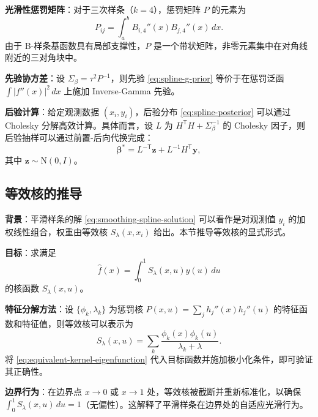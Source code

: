 \textbf{光滑性惩罚矩阵}：对于三次样条（$k=4$），惩罚矩阵 $P$ 的元素为
\begin{equation}
P_{ij} = \int_a^b B_{i,4}''(x) B_{j,4}''(x)\, dx.
\label{eq:spline-penalty-matrix}
\end{equation}
由于 B-样条基函数具有局部支撑性，$P$ 是一个带状矩阵，非零元素集中在对角线附近的三对角块中。

\textbf{先验协方差}：设 $\Sigma_\beta = \tau^2 P^{-1}$，则先验 \eqref{eq:spline-g-prior} 等价于在惩罚泛函 $\int |f''(x)|^2\, dx$ 上施加 Inverse-Gamma 先验。

\textbf{后验计算}：给定观测数据 $(x_i, y_i)$，后验分布 \eqref{eq:spline-posterior} 可以通过 Cholesky 分解高效计算。具体而言，设 $L$ 为 $H^{\mathsf{T}} H + \Sigma_\beta^{-1}$ 的 Cholesky 因子，则后验抽样可以通过前置-后向代换完成：
\begin{equation}
\boldsymbol{\beta}^* = L^{-\mathsf{T}} \mathbf{z} + L^{-1} H^{\mathsf{T}} \mathbf{y},
\label{eq:spline-posterior-sampling}
\end{equation}
其中 $\mathbf{z} \sim \mathrm{N}(0, I)$。

\subsection{等效核的推导}\label{sec:derivation-equivalent-kernel}

\textbf{背景}：平滑样条的解 \eqref{eq:smoothing-spline-solution} 可以看作是对观测值 $y_i$ 的加权线性组合，权重由等效核 $S_\lambda(x, x_i)$ 给出。本节推导等效核的显式形式。

\textbf{目标}：求满足
\begin{equation}
\hat{f}(x) = \int_0^1 S_\lambda(x, u) y(u)\, du
\label{eq:equivalent-kernel-goal}
\end{equation}
的核函数 $S_\lambda(x, u)$。

\textbf{特征分解方法}：设 $\{\phi_k, \lambda_k\}$ 为惩罚核 $P(x, u) = \sum_j h_j''(x) h_j''(u)$ 的特征函数和特征值，则等效核可以表示为
\begin{equation}
S_\lambda(x, u) = \sum_k \frac{\phi_k(x) \phi_k(u)}{\lambda_k + \lambda}.
\label{eq:equivalent-kernel-eigenfunction}
\end{equation}
将 \eqref{eq:equivalent-kernel-eigenfunction} 代入目标函数并施加极小化条件，即可验证其正确性。

\textbf{边界行为}：在边界点 $x \to 0$ 或 $x \to 1$ 处，等效核被截断并重新标准化，以确保 $\int_0^1 S_\lambda(x, u)\, du = 1$（无偏性）。这解释了平滑样条在边界处的自适应光滑行为。

